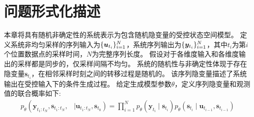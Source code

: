 
\section{问题形式化描述}
\label{sec:5_formal}
本章将具有随机非确定性的系统表示为包含随机隐变量的受控状态空间模型。
定义系统非均匀采样的序列输入为$\{\boldsymbol{u}_{t_i}\}_{i=1}^{N}$，系统序列输出为$\{\boldsymbol{y}_{t_i}\}_{i=1}^{N}$，其中$t_i$为第$i$个位置数据点的采样时间，$N$为完整序列长度。
假设对于各维度输入和各维度输出的采样都是同步的，仅采样间隔不均匀。
系统的随机性与非确定性体现于存在隐变量$\boldsymbol{s}_{t_{i}}$，在相邻采样时刻之间的转移过程是随机的。
该序列隐变量描述了系统输出在受控输入下的条件生成过程。
给定生成模型参数$\theta$，定义序列隐变量和观测值的联合概率如下:
\begin{equation}
    \begin{aligned}
    p_{\theta}\left(\boldsymbol{y}_{t_1: t_N}, \boldsymbol{s}_{t_1:t_N},\right.&\left. \mid \boldsymbol{u}_{t_1: t_N}, \boldsymbol{s}_{t_0}\right)=\prod_{i=1}^{N}
    p_{\theta}\left(\boldsymbol{y}_{t_i} \mid \boldsymbol{s}_{t_i}\right)   {p}_{\theta}\left(\boldsymbol{s}_{t_i} \mid \boldsymbol{u}_{t_{i-1}},\boldsymbol{s}_{t_{i-1}}\right)
    \end{aligned}
    \label{equ:discrete_rssm}
\end{equation}
